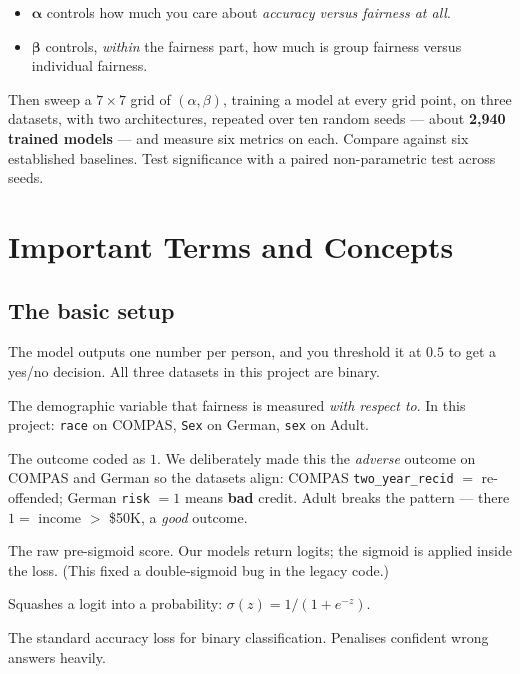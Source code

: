 \documentclass[11pt,a4paper]{article}
\newcommand{\code}[1]{\texttt{\small #1}}
\begin{document}
\begin{itemize}
\item $\boldsymbol{\alpha}$ controls how much you care about \emph{accuracy
versus fairness at all}.
\item $\boldsymbol{\beta}$ controls, \emph{within} the fairness part, how much
is group fairness versus individual fairness.
\end{itemize}

Then sweep a $7\times7$ grid of $(\alpha,\beta)$, training a model at every
grid point, on three datasets, with two architectures, repeated over ten random
seeds --- about \textbf{2{,}940 trained models} --- and measure six metrics on
each. Compare against six established baselines. Test significance with a
paired non-parametric test across seeds.

\section{Important Terms and Concepts}

\subsection{The basic setup}

\begin{description}[leftmargin=0em,style=nextline,itemsep=5pt]

\item[Binary classification]
The model outputs one number per person, and you threshold it at $0.5$ to get a
yes/no decision. All three datasets in this project are binary.

\item[Sensitive attribute (also: protected attribute)]
The demographic variable that fairness is measured \emph{with respect to}. In
this project: \code{race} on COMPAS, \code{Sex} on German, \code{sex} on Adult.

\item[Positive class]
The outcome coded as $1$. We deliberately made this the \emph{adverse} outcome
on COMPAS and German so the datasets align: COMPAS \code{two\_year\_recid} $=$
re-offended; German \code{risk} $=1$ means \textbf{bad} credit. Adult breaks the
pattern --- there $1 =$ income $>$ \$50K, a \emph{good} outcome.

\item[Logit]
The raw pre-sigmoid score. Our models return logits; the sigmoid is applied
inside the loss. (This fixed a double-sigmoid bug in the legacy code.)

\item[Sigmoid]
Squashes a logit into a probability: $\sigma(z) = 1/(1+e^{-z})$.

\item[BCE (Binary Cross-Entropy)]
The standard accuracy loss for binary classification. Penalises confident wrong
answers heavily.

\end{description}
\end{document}
